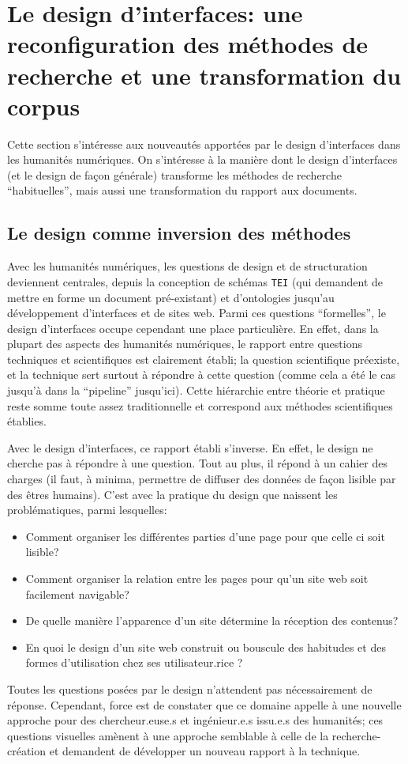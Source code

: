 \documentclass[a4paper, 12pt, twoside]{book}
\newcommand{\tei}{\texttt{TEI}}
\begin{document}
\section{Le design d'interfaces: une reconfiguration des méthodes de recherche et une transformation du corpus}
Cette section s'intéresse aux nouveautés apportées par le design d'interfaces dans les humanités numériques. On s'intéresse à la manière dont le design d'interfaces (et le design de façon générale) transforme les méthodes de recherche \enquote{habituelles}, mais aussi une transformation du rapport aux documents.

\subsection{Le design comme inversion des méthodes}
Avec les humanités numériques, les questions de design et de structuration deviennent centrales, depuis la conception de schémas \tei{} (qui demandent de mettre en forme un document pré-existant) et d'ontologies jusqu'au développement d'interfaces et de sites web. Parmi ces questions \enquote{formelles}, le design d'interfaces occupe cependant une place particulière. En effet, dans la plupart des aspects des humanités numériques, le rapport entre questions techniques et scientifiques est clairement établi; la question scientifique préexiste, et la technique sert surtout à répondre à cette question (comme cela a été le cas jusqu'à dans la \enquote{pipeline} jusqu'ici). Cette hiérarchie entre théorie et pratique reste somme toute assez traditionnelle et correspond aux méthodes scientifiques établies. 

Avec le design d'interfaces, ce rapport établi s'inverse. En effet, le design ne cherche pas à répondre à une question. Tout au plus, il répond à un cahier des charges (il faut, à minima, permettre de diffuser des données de façon lisible par des êtres humains). C'est avec la pratique du design que naissent les problématiques, parmi lesquelles: 
\begin{itemize}
	\item Comment organiser les différentes parties d'une page pour que celle ci soit lisible? 
	\item Comment organiser la relation entre les pages pour qu'un site web soit facilement navigable? 
	\item De quelle manière l'apparence d'un site détermine la réception des contenus?
	\item En quoi le design d'un site web construit ou bouscule des habitudes et des formes d'utilisation chez ses utilisateur.rice ?
\end{itemize}
Toutes les questions posées par le design n'attendent pas nécessairement de réponse. Cependant, force est de constater que ce domaine appelle à une nouvelle approche pour des chercheur.euse.s et ingénieur.e.s issu.e.s des humanités; ces questions visuelles amènent à une approche semblable à celle de la recherche-création et demandent de développer un nouveau rapport à la technique.
\end{document}
